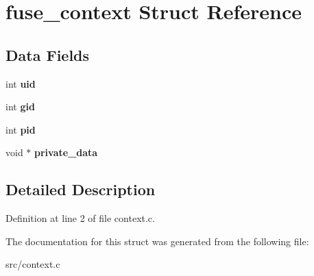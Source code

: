 \hypertarget{structfuse__context}{\section{fuse\-\_\-context \-Struct \-Reference}
\label{structfuse__context}
}
\subsection*{\-Data \-Fields}
\begin{DoxyCompactItemize}
\item 
\hypertarget{structfuse__context_a7cbe070456c3cf0f56a6783864626cfa}{int {\bfseries uid}}\label{structfuse__context_a7cbe070456c3cf0f56a6783864626cfa}

\item 
\hypertarget{structfuse__context_abb0014c73090b48c04886647a22b698e}{int {\bfseries gid}}\label{structfuse__context_abb0014c73090b48c04886647a22b698e}

\item 
\hypertarget{structfuse__context_aa23677276f81629698eed626aa001345}{int {\bfseries pid}}\label{structfuse__context_aa23677276f81629698eed626aa001345}

\item 
\hypertarget{structfuse__context_a198911619cb8ee1a0b11302b94b6027e}{void $\ast$ {\bfseries private\-\_\-data}}\label{structfuse__context_a198911619cb8ee1a0b11302b94b6027e}

\end{DoxyCompactItemize}


\subsection{\-Detailed \-Description}


\-Definition at line 2 of file context.\-c.



\-The documentation for this struct was generated from the following file\-:\begin{DoxyCompactItemize}
\item 
src/context.\-c\end{DoxyCompactItemize}
